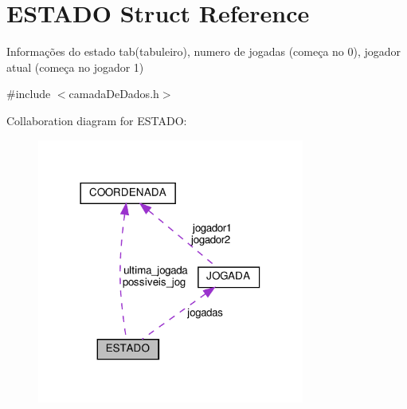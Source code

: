 \hypertarget{structESTADO}{}\section{E\+S\+T\+A\+DO Struct Reference}
\label{structESTADO}


Informações do estado tab(tabuleiro), numero de jogadas (começa no 0), jogador atual (começa no jogador 1)  




{\ttfamily \#include $<$camada\+De\+Dados.\+h$>$}



Collaboration diagram for E\+S\+T\+A\+DO\+:
\nopagebreak
\begin{figure}[H]
\begin{center}
\leavevmode
\includegraphics[width=249pt]{structESTADO__coll__graph}
\end{center}
\end{figure}
